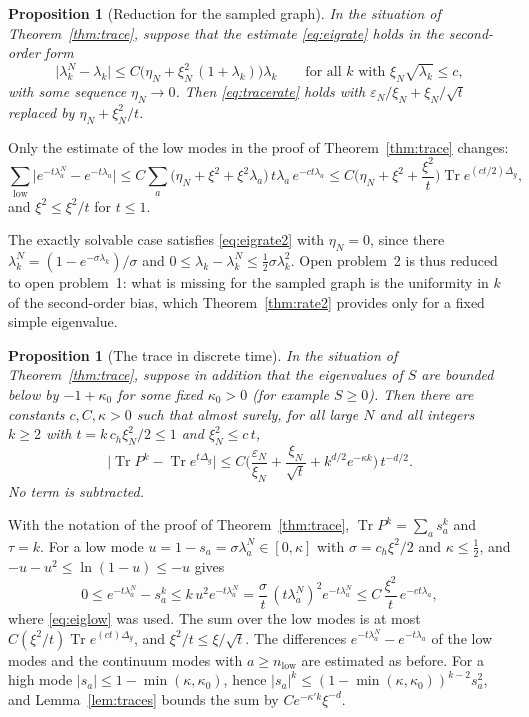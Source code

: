 \documentclass[11pt,a4paper]{article}
\makeatletter
\theoremstyle{stmt}
\newtheorem{proposition}[theorem]{Proposition}
\theoremstyle{defn}
\theoremstyle{rmk}
\renewenvironment{proof}[1][\proofname]{\par\pushQED{\qed}\normalfont\topsep6\p@\@plus6\p@\relax
  \trivlist\item[\hskip\labelsep{\sffamily\itshape\small #1.}]\ignorespaces}{\popQED\endtrivlist\@endpefalse}
\numberwithin{equation}{section}
\DeclareMathOperator{\Tr}{Tr}
\makeatother
\begin{document}
{\begin{proposition}[Reduction for the sampled graph]\label{prop:ratereduction}
In the situation of Theorem~\ref{thm:trace}, suppose that the estimate \eqref{eq:eigrate} holds in the second-order form
\begin{equation}\label{eq:eigrate2}
\big|\lambda_k^N-\lambda_k\big|\le C\big(\eta_N+\xi_N^2\,(1+\lambda_k)\big)\lambda_k\qquad\text{for all }k\text{ with }\xi_N\sqrt{\lambda_k}\le c ,
\end{equation}
with some sequence $\eta_N\to0$. Then \eqref{eq:tracerate} holds with $\varepsilon_N/\xi_N+\xi_N/\sqrt t$ replaced by $\eta_N+\xi_N^2/t$.
\end{proposition}

\begin{proof}
Only the estimate of the low modes in the proof of Theorem~\ref{thm:trace} changes:
\[
\sum_{\mathrm{low}}\big|e^{-t\lambda_a^N}-e^{-t\lambda_a}\big|\le C\sum_a\big(\eta_N+\xi^2+\xi^2\lambda_a\big)\,t\lambda_a\,e^{-ct\lambda_a}\le C\Big(\eta_N+\xi^2+\frac{\xi^2}{t}\Big)\Tr e^{(ct/2)\Delta_g},
\]
and $\xi^2\le\xi^2/t$ for $t\le1$.
\end{proof}

The exactly solvable case satisfies \eqref{eq:eigrate2} with $\eta_N=0$, since there $\lambda^N_k=(1-e^{-\sigma\lambda_k})/\sigma$ and $0\le\lambda_k-\lambda_k^N\le\tfrac12\sigma\lambda_k^2$. Open problem~2 is thus reduced to open problem~1: what is missing for the sampled graph is the uniformity in $k$ of the second-order bias, which Theorem~\ref{thm:rate2} provides only for a fixed simple eigenvalue.

\begin{proposition}[The trace in discrete time]\label{prop:discrete}
In the situation of Theorem~\ref{thm:trace}, suppose in addition that the eigenvalues of $S$ are bounded below by $-1+\kappa_0$ for some fixed $\kappa_0>0$ (for example $S\ge0$). Then there are constants $c,C,\kappa>0$ such that almost surely, for all large $N$ and all integers $k\ge2$ with $t=k\,c_h\xi_N^2/2\le1$ and $\xi_N^2\le c\,t$,
\[
\big|\Tr P^k-\Tr e^{t\Delta_g}\big|\le C\Big(\frac{\varepsilon_N}{\xi_N}+\frac{\xi_N}{\sqrt t}+k^{d/2}e^{-\kappa k}\Big)\,t^{-d/2}.
\]
No term is subtracted.
\end{proposition}

\begin{proof}
With the notation of the proof of Theorem~\ref{thm:trace}, $\Tr P^k=\sum_as_a^k$ and $\tau=k$. For a low mode $u=1-s_a=\sigma\lambda_a^N\in[0,\kappa]$ with $\sigma=c_h\xi^2/2$ and $\kappa\le\tfrac12$, and $-u-u^2\le\ln(1-u)\le-u$ gives
\[
0\le e^{-t\lambda_a^N}-s_a^k\le k\,u^2e^{-t\lambda_a^N}=\frac\sigma t\,(t\lambda_a^N)^2e^{-t\lambda_a^N}\le C\,\frac{\xi^2}{t}\,e^{-ct\lambda_a},
\]
where \eqref{eq:eiglow} was used. The sum over the low modes is at most $C(\xi^2/t)\Tr e^{(ct)\Delta_g}$, and $\xi^2/t\le\xi/\sqrt t$. The differences $e^{-t\lambda_a^N}-e^{-t\lambda_a}$ of the low modes and the continuum modes with $a\ge n_{\mathrm{low}}$ are estimated as before. For a high mode $|s_a|\le1-\min(\kappa,\kappa_0)$, hence $|s_a|^k\le(1-\min(\kappa,\kappa_0))^{k-2}s_a^2$, and Lemma~\ref{lem:traces} bounds the sum by $Ce^{-\kappa'k}\xi^{-d}$.
\end{proof}

}
\end{document}
